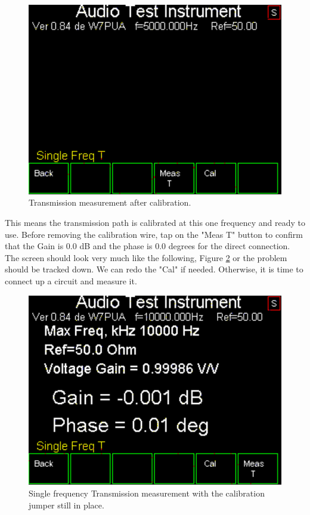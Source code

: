 \begin{figure}[H]
\begin{center}
\includegraphics[scale=0.75]{./images/AVNA_044.pdf}
\caption{Transmission measurement after calibration.}
\label{AVNA_044-label}
\end{center}
\end{figure}
%
This means the transmission path is calibrated at this one frequency and ready to use.  Before removing the calibration wire, tap on the "Meas T" button to confirm that the Gain is 0.0 dB and the phase is 0.0 degrees for the direct connection.  The screen should look very much like the following, Figure \ref{AVNA_033-label} or the problem should be tracked down.  We can redo the "Cal" if needed.  Otherwise, it is time to connect up a circuit and measure it.
\begin{figure}[H]
\begin{center}
\includegraphics[scale=0.75]{./images/AVNA_033.pdf}
\caption{Single frequency Transmission measurement with the calibration jumper still in place.}
\label{AVNA_033-label}
\end{center}
\end{figure}
